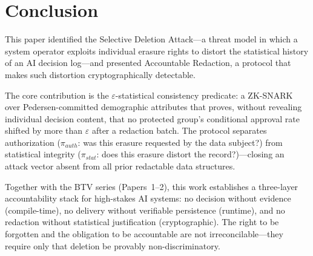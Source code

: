 \section{Conclusion}
\label{sec:conclusion}

This paper identified the Selective Deletion Attack---a threat model
in which a system operator exploits individual erasure rights to
distort the statistical history of an AI decision log---and presented
Accountable Redaction, a protocol that makes such distortion
cryptographically detectable.

The core contribution is the $\varepsilon$-statistical consistency
predicate: a ZK-SNARK over Pedersen-committed demographic attributes
that proves, without revealing individual decision content, that no
protected group's conditional approval rate shifted by more than
$\varepsilon$ after a redaction batch.  The protocol separates
authorization ($\pi_{\mathit{auth}}$: was this erasure requested by the
data subject?) from statistical integrity ($\pi_{\mathit{stat}}$: does
this erasure distort the record?)---closing an attack vector absent
from all prior redactable data structures.

Together with the BTV series (Papers~1--2), this work establishes a
three-layer accountability stack for high-stakes AI systems:
no decision without evidence (compile-time),
no delivery without verifiable persistence (runtime),
and no redaction without statistical justification (cryptographic).
The right to be forgotten and the obligation to be accountable are not
irreconcilable---they require only that deletion be provably
non-discriminatory.
